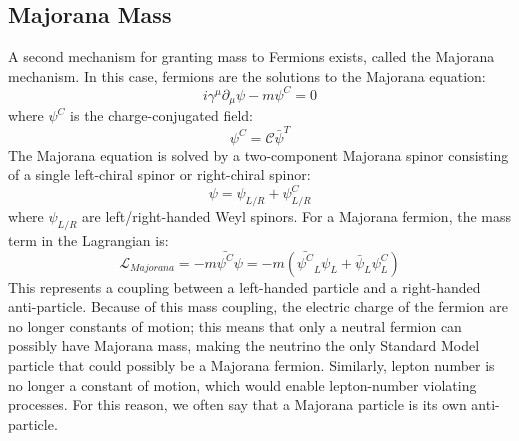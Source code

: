 \documentclass[/main.tex]{subfiles}
\begin{document}
\subsection{Majorana Mass}
A second mechanism for granting mass to Fermions exists, called the Majorana mechanism\cite{Majorana1937}.
In this case, fermions are the solutions to the Majorana equation:
\begin{equation}
  i\gamma^\mu\partial_\mu\psi - m\psi^C = 0
\end{equation}
where $\psi^C$ is the charge-conjugated field:
\begin{equation}
  \psi^C=\mathcal{C}\bar\psi^T
\end{equation}
The Majorana equation is solved by a two-component Majorana spinor consisting of a single left-chiral spinor or right-chiral spinor:
\begin{equation}
  \psi=\psi_{L/R}+\psi_{L/R}^C
\end{equation}
where $\psi_{L/R}$ are left/right-handed Weyl spinors.
For a Majorana fermion, the mass term in the Lagrangian is:
\begin{equation}
  \mathcal{L}_{Majorana}=-m\bar{\psi^C}\psi=-m(\bar{\psi^C}_L\psi_L + \bar\psi_L\psi^C_L)
\end{equation}
This represents a coupling between a left-handed particle and a right-handed anti-particle.
Because of this mass coupling, the electric charge of the fermion are no longer constants of motion; this means that only a neutral fermion can possibly have Majorana mass, making the neutrino the only Standard Model particle that could possibly be a Majorana fermion.
Similarly, lepton number is no longer a constant of motion, which would enable lepton-number violating processes.
For this reason, we often say that a Majorana particle is its own anti-particle.
\end{document}
